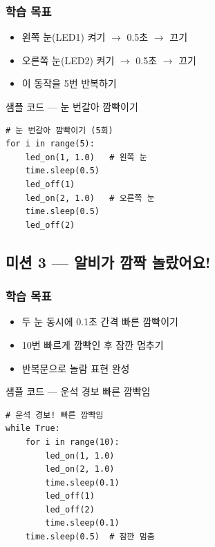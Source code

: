 \subsubsection*{학습 목표}
\begin{itemize}[leftmargin=1.4em]
  \item 왼쪽 눈(LED1) 켜기 $\rightarrow$ 0.5초 $\rightarrow$ 끄기
  \item 오른쪽 눈(LED2) 켜기 $\rightarrow$ 0.5초 $\rightarrow$ 끄기
  \item 이 동작을 5번 반복하기
\end{itemize}

\begin{labbox}{샘플 코드 --- 눈 번갈아 깜빡이기}
\begin{verbatim}
# 눈 번갈아 깜빡이기 (5회)
for i in range(5):
    led_on(1, 1.0)   # 왼쪽 눈
    time.sleep(0.5)
    led_off(1)
    led_on(2, 1.0)   # 오른쪽 눈
    time.sleep(0.5)
    led_off(2)
\end{verbatim}
\end{labbox}

\subsection{미션 3 --- 알비가 깜짝 놀랐어요!}
\label{subsec:ch03-m3}

\begin{storybox}
\end{storybox}

\subsubsection*{학습 목표}
\begin{itemize}[leftmargin=1.4em]
  \item 두 눈 동시에 0.1초 간격 빠른 깜빡이기
  \item 10번 빠르게 깜빡인 후 잠깐 멈추기
  \item 반복문으로 놀람 표현 완성
\end{itemize}

\begin{labbox}{샘플 코드 --- 운석 경보 빠른 깜빡임}
\begin{verbatim}
# 운석 경보! 빠른 깜빡임
while True:
    for i in range(10):
        led_on(1, 1.0)
        led_on(2, 1.0)
        time.sleep(0.1)
        led_off(1)
        led_off(2)
        time.sleep(0.1)
    time.sleep(0.5)  # 잠깐 멈춤
\end{verbatim}
\end{labbox}

